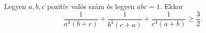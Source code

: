 Legyen $a,b,c$ pozitív valós szám és legyen $abc=1.$ Ekkor
$$
\frac{1}{a^{3}(b+c)}+\frac{1}{b^{3}(c+a)}+\frac{1}{c^{3}(a+b)} \ge \frac{3}{2}.
$$

